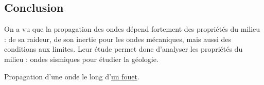 \subsection*{Conclusion}

On a vu que la propagation des ondes dépend fortement des propriétés du milieu : de sa raideur, de son inertie pour les ondes mécaniques, mais aussi des conditions aux limites.
Leur étude permet donc d'analyser les propriétés du milieu : ondes sismiques pour étudier la géologie.

\begin{funfact}
Propagation d'une onde le long d'\href{https://www.pourlascience.fr/sd/physique/le-claquement-du-fouet-4402.php}{un fouet}.
\end{funfact}

\newpage
